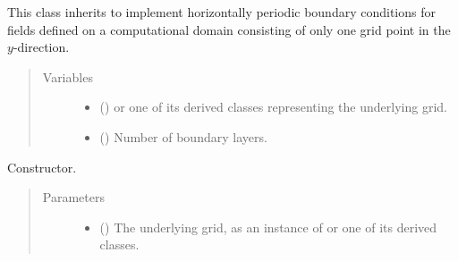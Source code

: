 \documentclass[letterpaper,10pt,english]{sphinxmanual}
\begin{document}
\begin{fulllineitems}
\label{\detokenize{api:tasmania.dycore.horizontal_boundary_periodic.PeriodicXZ}}
This class inherits {\hyperref[\detokenize{api:tasmania.dycore.horizontal_boundary.HorizontalBoundary}]{}} to implement horizontally
periodic boundary conditions for fields defined on a computational domain consisting of only one grid
point in the \(y\)-direction.
\begin{quote}\begin{description}
\item[{Variables}] \leavevmode\begin{itemize}
\item {} 
 () \textendash{} {\hyperref[\detokenize{api:tasmania.grids.grid_xyz.GridXYZ}]{}} or one of its derived classes representing the underlying grid.

\item {} 
{\hyperref[\detokenize{api:tasmania.dycore.prognostic_isentropic.PrognosticIsentropic.nb}]{}} () \textendash{} Number of boundary layers.

\end{itemize}

\end{description}\end{quote}

\begin{fulllineitems}
\label{\detokenize{api:tasmania.dycore.horizontal_boundary_periodic.PeriodicXZ.__init__}}
Constructor.
\begin{quote}\begin{description}
\item[{Parameters}] \leavevmode\begin{itemize}
\item {} 
 () \textendash{} The underlying grid, as an instance of {\hyperref[\detokenize{api:tasmania.grids.grid_xyz.GridXYZ}]{}} or one of its derived classes.


\end{itemize}
\end{description}
\end{quote}
\end{fulllineitems}
\end{fulllineitems}
\end{document}
